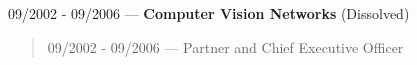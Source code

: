 09/2002 - 09/2006 --- {\bf Computer Vision Networks} (Dissolved)
\begin{quote}
09/2002 - 09/2006 --- Partner and Chief Executive Officer
\end{quote}
